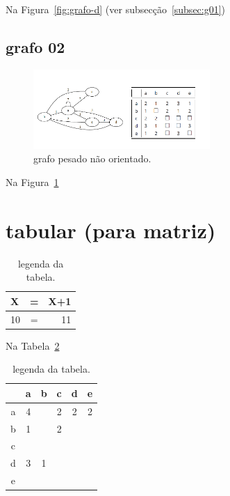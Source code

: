 \documentclass[a4wide]{report}
\begin{document}
Na Figura~\ref{fig:grafo-d}  (ver subsecção~\ref{subsec:g01})


\subsection{grafo 02}
\begin{figure}[h!bt]
    \centering
    \includegraphics[width=0.60\textwidth]{grafo-matrizadj.PNG} 
    \caption{grafo pesado não orientado. \label{fig:grafo}}
\end{figure}

Na Figura~\ref{fig:grafo}

\section{tabular (para matriz)}

\begin{table}[h]
    \centering
    \begin{tabular}{|l|c|r|}
        \hline
        X  & = & X+1 \\
        \hline
        10 & = & 11 \\
        \hline
    \end{tabular}
    \caption{legenda da tabela. }
    \label{tab:exemplo}
\end{table}
Na Tabela~\ref{tab:exemplo}
    
\begin{table}[h]
    \centering
     \begin{tabular}{|c|ccccc|}
        \hline
        & a & b & c & d & e \\
        \hline
        a & 4 & $\ $ & 2 & 2 & 2 \\
        b & 1 & $\ $ & 2 & $\ $ & $\ $ \\
        c & $\ $ & $\ $ & $\ $ & $\ $ & $\ $ \\
        d & 3 & 1 & $\ $ & $\ $ & $\ $ \\
        e & $\ $ & $\ $ & $\ $ & $\ $ & $\ $\\
        \hline
      \end{tabular}
    \caption{legenda da tabela. }
    \label{tab:exemplo}
\end{table}
\end{document}
